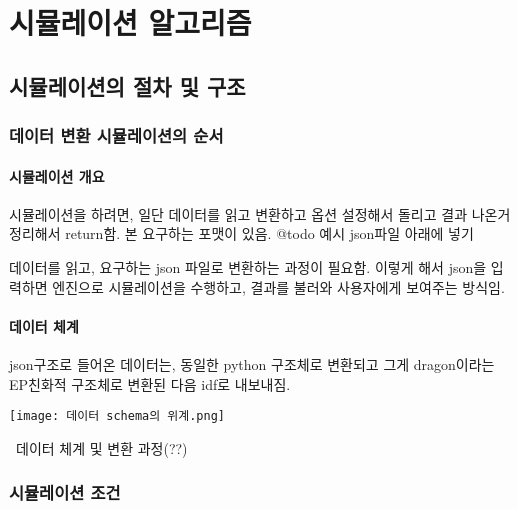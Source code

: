 \part{시뮬레이션 알고리즘}
\label{part:algorithm}


\chapter{시뮬레이션의 절차 및 구조}

\section{데이터 변환 시뮬레이션의 순서}

\subsection{시뮬레이션 개요}
시뮬레이션을 하려면, 일단 데이터를 읽고 변환하고 옵션 설정해서 돌리고 결과 나온거 정리해서 return함.
본 \simulator\는 요구하는 포맷이 있음. @todo 예시 json파일 아래에 넣기

데이터를 읽고, 요구하는 json 파일로 변환하는 과정이 필요함. 이렇게 해서 json을 입력하면 \simulator 엔진으로 시뮬레이션을 수행하고, 결과를 불러와 사용자에게 보여주는 방식임.

\subsection{데이터 체계}
json구조로 들어온 데이터는, 동일한 python 구조체로 변환되고 그게 dragon이라는 EP친화적 구조체로 변환된 다음 idf로 내보내짐.

\begin{defaultfigure}
  \texttt{[image: 데이터 schema의 위계.png]}
  \caption{\simulator\ 데이터 체계 및 변환 과정(??)}
  \label{fig:data_hierarchy}
\end{defaultfigure}


\section{시뮬레이션 조건}
